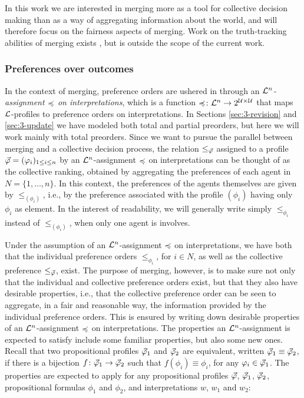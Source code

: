In this work we are interested in merging more as a tool for collective decision 
making than as a way of aggregating information about the world, 
and will therefore focus on the fairness aspects of merging.
Work on the truth-tracking abilities of merging exists \cite{EveraereKM10},
but is outside the scope of the current work.


\subsubsection{Preferences over outcomes}
In the context of merging, 
preference orders are ushered in 
through an \emph{$\L^{n}$-assignment $\as$ on interpretations}, 
which is a function $\as\colon\L^n\rightarrow 2^{\U\times\U}$ 
that maps $\L$-profiles
to preference orders on interpretations.
In Sections \ref{sec:3-revision} and \ref{sec:3-update}
we have modeled both total and partial preorders,
but here we will work mainly with total preorders.
Since we want to pursue the parallel between 
merging and a collective decision process,
the relation $\le_{\P}$ assigned to a profile 
$\P=(\phi_i)_{1\le i \le n}$
by an $\L^n$-assignment $\as$ on interpretations
can be thought of as the collective ranking, 
obtained by aggregating the preferences of each agent 
in $N=\{1,\dots,n\}$.
In this context, the preferences of the agents themselves 
are given by $\le_{(\phi_{i})}$,
i.e., by the preference associated with the profile $(\phi_{i})$ 
having only $\phi_{i}$ as element.
In the interest of readability, we will generally write 
simply $\le_{\phi_i}$ instead of $\le_{(\phi_i)}$, 
when only one agent is involves.

Under the assumption of an $\L^n$-assignment $\as$ on interpretations,
we have both that the individual preference orders $\le_{\phi_{i}}$, for $i\in N$,
as well as the collective preference $\le_{\P}$, exist.
The purpose of merging, however, is to make sure 
not only that the individual and collective preference 
orders exist, but that they also have desirable properties,
i.e., that the collective preference order can be seen 
to aggregate, in a fair and reasonable way,
the information provided by the individual preference orders.
This is ensured by writing down desirable properties 
of an $\L^n$-assignment $\as$ on interpretations.
The properties an $\L^n$-assignment is expected to satisfy 
include some familiar properties, but also some new ones.
Recall that two propositional profiles $\P_1$ and $\P_2$
are equivalent, written $\P_1\equiv\P_2$, if there is a bijection
$f\colon\P_1\rightarrow\P_2$ such that $f(\phi_i)\equiv \phi_i$,
for any $\phi_i\in\P_1$.
The properties are expected to apply for any propositional profiles 
$\P$, $\P_1$, $\P_2$, propositional formulas $\phi_1$ and $\phi_2$,
and interpretations $w$, $w_1$ and $w_2$:

